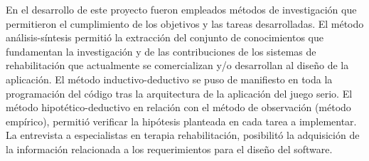 \begin{introduction}
    \vspace{10pt}
    En el desarrollo de este proyecto fueron empleados métodos de investigación que
    permitieron el cumplimiento de los objetivos y las tareas desarrolladas. El método análisis-síntesis 
    permitió la extracción del conjunto de conocimientos que fundamentan la
    investigación y de las contribuciones de los sistemas de rehabilitación que actualmente se
    comercializan y/o desarrollan al diseño de la aplicación. El método inductivo-deductivo se puso
    de manifiesto en toda la programación del código tras la arquitectura de la aplicación del juego serio.
    El método hipotético-deductivo en relación con el método de observación (método
    empírico), permitió verificar la hipótesis planteada en cada tarea a implementar. La entrevista
    a especialistas en terapia rehabilitación,
    posibilitó la adquisición de la información relacionada a los requerimientos para el diseño del
    software.

\end{introduction}

